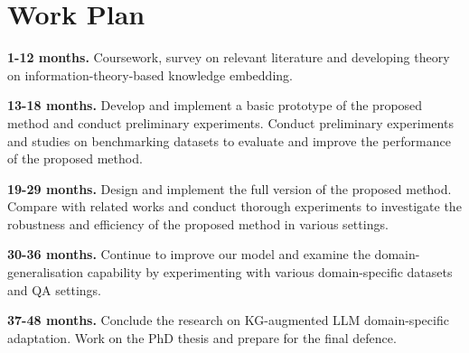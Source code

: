 \section*{Work Plan}

\textbf{1-12 months. }
Coursework, survey on relevant literature and developing theory on information-theory-based knowledge embedding.

\textbf{13-18 months. }
Develop and implement a basic prototype of the proposed method and conduct preliminary experiments.
Conduct preliminary experiments and studies on benchmarking datasets to evaluate and improve the performance of the proposed method.

\textbf{19-29 months. }
Design and implement the full version of the proposed method. 
Compare with related works and conduct thorough experiments to investigate the robustness and efficiency of the proposed method in various settings.

\textbf{30-36 months. }
Continue to improve our model and examine the domain-generalisation capability by experimenting with various domain-specific datasets and QA settings.

\textbf{37-48 months. }
Conclude the research on KG-augmented LLM domain-specific adaptation. 
Work on the PhD thesis and prepare for the final defence.
